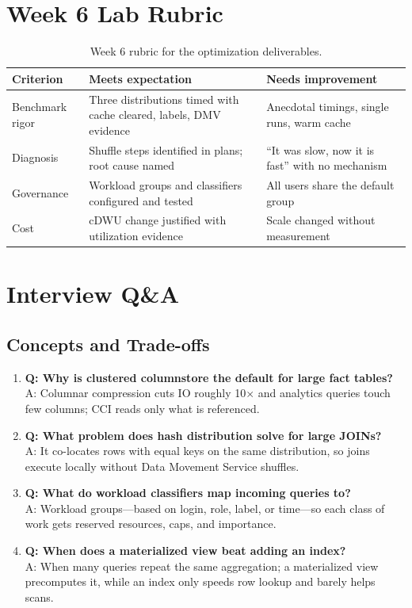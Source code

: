 \section{Week 6 Lab Rubric}
\begin{table}[H]
\centering
\small
\begin{tabular}{@{}p{3.2cm}p{5.0cm}p{5.0cm}@{}}
\toprule
\textbf{Criterion} & \textbf{Meets expectation} & \textbf{Needs improvement} \\
\midrule
Benchmark rigor & Three distributions timed with cache cleared, labels, DMV evidence & Anecdotal timings, single runs, warm cache \\
Diagnosis & Shuffle steps identified in plans; root cause named & ``It was slow, now it is fast'' with no mechanism \\
Governance & Workload groups and classifiers configured and tested & All users share the default group \\
Cost & cDWU change justified with utilization evidence & Scale changed without measurement \\
\bottomrule
\end{tabular}
\caption{Week 6 rubric for the optimization deliverables.}
\label{tab:ch6-rubric}
\end{table}

\section{Interview Q\&A}
\subsection{Concepts and Trade-offs}
\begin{enumerate}
    \item \textbf{Q: Why is clustered columnstore the default for large fact tables?}\\
    A: Columnar compression cuts IO roughly 10$\times$ and analytics queries touch few columns; CCI reads only what is referenced.
    \item \textbf{Q: What problem does hash distribution solve for large JOINs?}\\
    A: It co-locates rows with equal keys on the same distribution, so joins execute locally without Data Movement Service shuffles.
    \item \textbf{Q: What do workload classifiers map incoming queries to?}\\
    A: Workload groups---based on login, role, label, or time---so each class of work gets reserved resources, caps, and importance.
    \item \textbf{Q: When does a materialized view beat adding an index?}\\
    A: When many queries repeat the same aggregation; a materialized view precomputes it, while an index only speeds row lookup and barely helps scans.
\end{enumerate}

